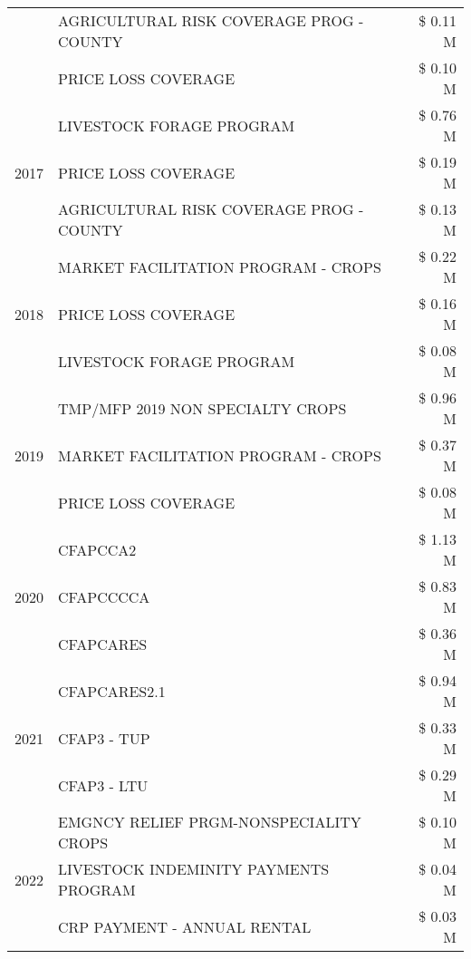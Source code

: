 \begin{tabular}{llr}
 & AGRICULTURAL RISK COVERAGE PROG - COUNTY & \$ 0.11 M \\
 & PRICE LOSS COVERAGE & \$ 0.10 M \\
\cline{1-3}
\multirow[t]{3}{*}{2017} & LIVESTOCK FORAGE PROGRAM & \$ 0.76 M \\
 & PRICE LOSS COVERAGE & \$ 0.19 M \\
 & AGRICULTURAL RISK COVERAGE PROG - COUNTY & \$ 0.13 M \\
\cline{1-3}
\multirow[t]{3}{*}{2018} & MARKET FACILITATION PROGRAM - CROPS & \$ 0.22 M \\
 & PRICE LOSS COVERAGE & \$ 0.16 M \\
 & LIVESTOCK FORAGE PROGRAM & \$ 0.08 M \\
\cline{1-3}
\multirow[t]{3}{*}{2019} & TMP/MFP 2019 NON SPECIALTY CROPS & \$ 0.96 M \\
 & MARKET FACILITATION PROGRAM - CROPS & \$ 0.37 M \\
 & PRICE LOSS COVERAGE & \$ 0.08 M \\
\cline{1-3}
\multirow[t]{3}{*}{2020} & CFAPCCA2 & \$ 1.13 M \\
 & CFAPCCCCA & \$ 0.83 M \\
 & CFAPCARES & \$ 0.36 M \\
\cline{1-3}
\multirow[t]{3}{*}{2021} & CFAPCARES2.1 & \$ 0.94 M \\
 & CFAP3 - TUP & \$ 0.33 M \\
 & CFAP3 - LTU & \$ 0.29 M \\
\cline{1-3}
\multirow[t]{3}{*}{2022} & EMGNCY RELIEF PRGM-NONSPECIALITY CROPS & \$ 0.10 M \\
 & LIVESTOCK INDEMINITY PAYMENTS PROGRAM & \$ 0.04 M \\
 & CRP PAYMENT - ANNUAL RENTAL & \$ 0.03 M \\
\cline{1-3}
\bottomrule
\end{tabular}
